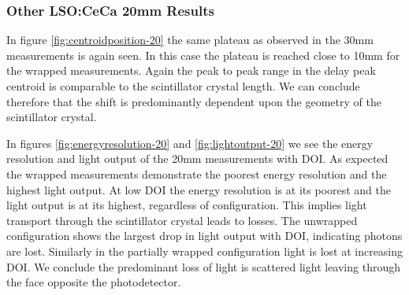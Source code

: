 \subsubsection{Other LSO:CeCa 20mm Results}
In figure \ref{fig:centroidposition-20} the same plateau as observed in the 30mm measurements is again seen. In this case the plateau is reached close to 10mm for the wrapped measurements. Again the peak to peak range in the delay peak centroid is comparable to the scintillator crystal length. We can conclude therefore that the shift is predominantly dependent upon the geometry of the scintillator crystal. 

In figures \ref{fig:energyresolution-20} and \ref{fig:lightoutput-20} we see the energy resolution and light output of the 20mm measurements with DOI. As expected the wrapped measurements demonstrate the poorest energy resolution and the highest light output.  At low DOI the energy resolution is at its poorest and the light output is at its highest, regardless of configuration. This implies light transport through the scintillator crystal leads to losses. The unwrapped configuration shows the largest drop in light output with DOI, indicating photons are lost. Similarly in the partially wrapped configuration light is lost at increasing DOI. We conclude the predominant loss of light is scattered light leaving through the face opposite the photodetector.